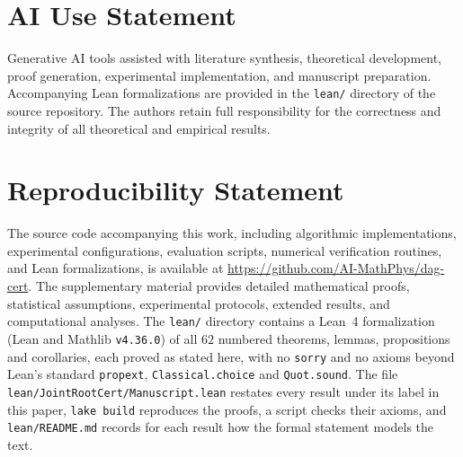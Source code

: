 \documentclass{article}
\theoremstyle{plain}
\theoremstyle{definition}
\begin{document}
\section*{AI Use Statement}
Generative AI tools assisted with literature synthesis,
theoretical development, proof generation, experimental
implementation, and manuscript preparation. Accompanying
Lean formalizations are provided in the \texttt{lean/}
directory of the source repository. The authors retain
full responsibility for the correctness and integrity
of all theoretical and empirical results.


\section*{Reproducibility Statement}

The source code accompanying this work, including algorithmic
implementations, experimental configurations, evaluation
scripts, numerical verification routines, and Lean
formalizations, is available at
\url{https://github.com/AI-MathPhys/dag-cert}.
%
The supplementary material provides detailed mathematical
proofs, statistical assumptions, experimental protocols,
extended results, and computational analyses. The
\texttt{lean/} directory contains a Lean~4 formalization
(Lean and Mathlib \texttt{v4.36.0}) of all $62$ numbered
theorems, lemmas, propositions and corollaries, each proved
as stated here, with no \texttt{sorry} and no axioms beyond
Lean's standard \texttt{propext}, \texttt{Classical.choice}
and \texttt{Quot.sound}. The file
\texttt{lean/JointRootCert/Manuscript.lean} restates every
result under its label in this paper, \texttt{lake build}
reproduces the proofs, a script checks their axioms, and
\texttt{lean/README.md} records for each result how the
formal statement models the text.
\end{document}

